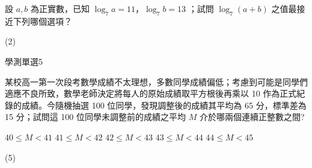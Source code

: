 \begin{QUESTIONS}
\begin{QUESTION}
        \begin{QBODY}
            設 $a, b$ 為正實數，已知 $\log_7 a = 11$，$\log_7 b = 13$ ；試問 $\log_7 (a + b)$ 之值最接近下列哪個選項？ 
			\begin{QOPS} 
			\end{QOPS}
        \end{QBODY}
        \begin{QFROMS}
        \end{QFROMS}
        \begin{QTAGS}\end{QTAGS}
        \begin{QANS}
            (2)
        \end{QANS}
        \begin{QSOLLIST}
        \end{QSOLLIST}
        \begin{QEMPTYSPACE}
        \end{QEMPTYSPACE}
    \end{QUESTION}
    \begin{QUESTION}
        \begin{ExamInfo}{94}{學測}{單選}{5}
        \end{ExamInfo}
        \begin{ExamAnsRateInfo}{8}{10}{7}{7}
        \end{ExamAnsRateInfo}
        \begin{QBODY}
            某校高一第一次段考數學成績不太理想，多數同學成績偏低；考慮到可能是同學們適應不良所致，數學老師決定將每人的原始成績取平方根後再乘以 10 作為正式紀錄的成績。今隨機抽選 100 位同學，發現調整後的成績其平均為 65 分，標準差為 15 分；試問這 100 位同學未調整前的成績之平均 $M$ 介於哪兩個連續正整數之間? 
			\begin{QOPS} 
				\QOP $40 \leq M <41$ 
				\QOP $41\leq  M<42$ 
				\QOP$ 42 \leq M<43$        
				\QOP $43 \leq M<44$        
				\QOP $44\leq  M<45$
			\end{QOPS}
        \end{QBODY}
        \begin{QFROMS}
        \end{QFROMS}
        \begin{QTAGS}\end{QTAGS}
        \begin{QANS}
            (5)
        \end{QANS}
        \begin{QSOLLIST}
        \end{QSOLLIST}
        \begin{QEMPTYSPACE}
        \end{QEMPTYSPACE}
    \end{QUESTION}
\end{QUESTIONS}
